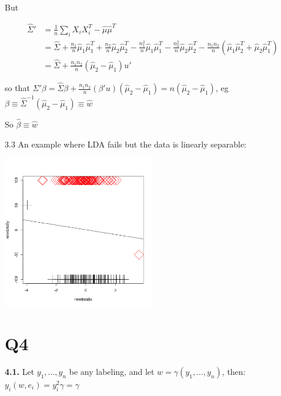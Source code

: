 \documentclass[11pt]{article}
\begin{document}
But

\begin{align*}
\hat \Sigma' &= \frac1n \sum_i X_i X_i^T -  \hat \mu \hat \mu^T
\\& = \hat \Sigma + \frac{n_1}n \hat \mu_1\hat \mu_1^T + \frac{n_2}n \hat \mu_2\hat \mu_2^T
-  \frac{n_1^2}{n} \hat \mu_1 \hat \mu_1^T
-  \frac{n_2^2}{n} \hat \mu_2 \hat \mu_2^T
- \frac{n_1n_2}{n}(\hat \mu_1 \hat \mu_2^T + \hat \mu_2 \hat \mu_1^T)
\\&= \hat \Sigma + \frac{n_1n_2}n (\hat \mu_2 - \hat \mu_1)u'
\end{align*}


so that \(\Sigma' \beta = \hat \Sigma \beta + \frac{n_1n_2}n (\beta'u)(\hat \mu_2 - \hat \mu_1) = n (\hat \mu_2 - \hat \mu_1)\), eg
\(\beta \equiv \hat \Sigma^{-1} (\hat \mu_2 - \hat \mu_1) \equiv \hat w\)

So \(\hat \beta \equiv \hat w\)

3.3 An example where LDA fails but the data is linearly separable:

\begin{org}
\begin{center}
\includegraphics[width=0.5\textwidth]{img/faillda.png}
\end{center}
\end{org}

\section{Q4}
\label{sec:orgheadline4}
\textbf{4.1.}
   Let \(y_1, \ldots, y_n\) be any labeling, and let \(w = \gamma (y_1, \ldots, y_n)\), then:
   \(y_i (w, e_i) = y_i^2 \gamma = \gamma\)
\end{document}
